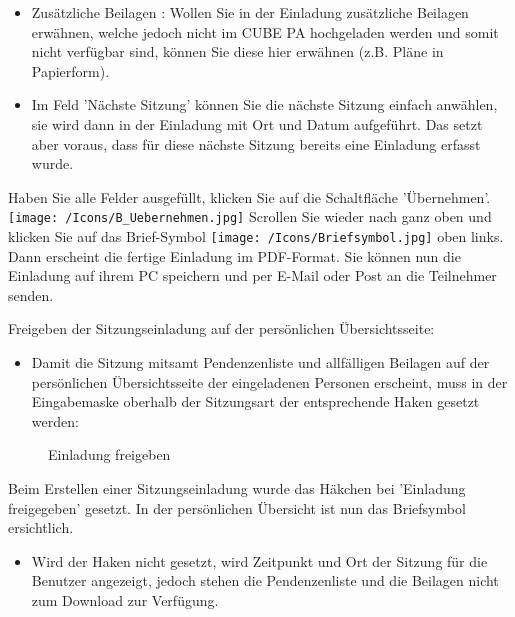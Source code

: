 \begin{itemize}
\item 
Zusätzliche Beilagen : Wollen Sie in der Einladung zusätzliche Beilagen erwähnen, welche jedoch nicht im CUBE PA hochgeladen werden und somit nicht verfügbar sind, können Sie diese hier erwähnen (z.B. Pläne in Papierform).
\item 
Im Feld 'Nächste Sitzung' können Sie die nächste Sitzung einfach anwählen, sie wird dann in der Einladung mit Ort und Datum aufgeführt. Das setzt aber voraus, dass für diese nächste Sitzung bereits eine Einladung erfasst wurde.
\end{itemize}

Haben Sie alle Felder ausgefüllt, klicken Sie auf die Schaltfläche 'Übernehmen'. \texttt{[image: /Icons/B\_Uebernehmen.jpg]} \newline
Scrollen Sie wieder nach ganz oben und klicken Sie auf das Brief-Symbol \texttt{[image: /Icons/Briefsymbol.jpg]} oben links. Dann erscheint die fertige Einladung im PDF-Format. Sie können nun die Einladung auf ihrem PC speichern und per E-Mail oder Post an die Teilnehmer senden.

\vspace{\baselineskip}

Freigeben der Sitzungseinladung auf der persönlichen Übersichtsseite:

\begin{itemize}
\item
Damit die Sitzung mitsamt Pendenzenliste und allfälligen Beilagen auf der persönlichen Übersichtsseite der eingeladenen Personen erscheint, muss in der Eingabemaske oberhalb der Sitzungsart der entsprechende Haken gesetzt werden:
\end{itemize}

\begin{figure}[H]
\caption{Einladung freigeben}
\end{figure}

\begin{small}
Beim Erstellen einer Sitzungseinladung wurde das Häkchen bei 'Einladung freigegeben' gesetzt. In der persönlichen Übersicht ist nun das Briefsymbol ersichtlich.
\end{small}

\begin{itemize}
\item
Wird der Haken nicht gesetzt, wird Zeitpunkt und Ort der Sitzung für die Benutzer angezeigt, jedoch stehen die Pendenzenliste und die Beilagen nicht zum Download zur Verfügung.
\end{itemize}

